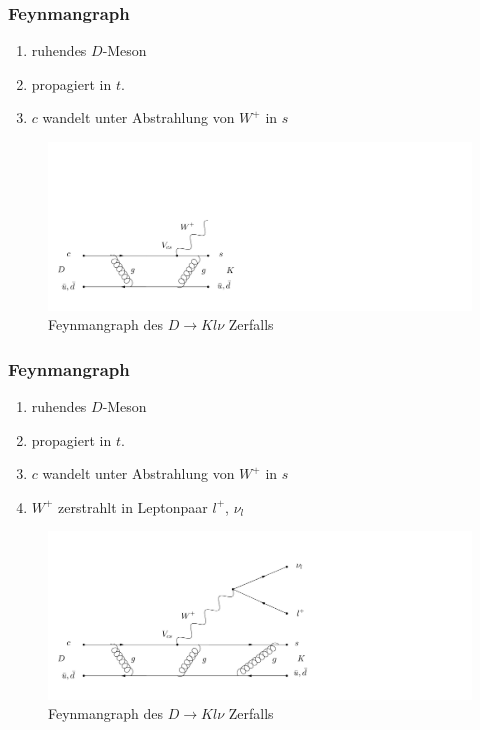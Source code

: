 \documentclass[hyperref={pdfpagelabels=false}]{beamer}
\begin{document}
 \begin{frame}
  \frametitle{Feynmangraph}
  \setcounter{framenumber}{4}
 \begin{minipage}[h]{0.38\textwidth}
  \begin{enumerate}
   \item ruhendes $D$-Meson
   \item propagiert in $t$.
   \item $c$ wandelt unter Abstrahlung von $W^+$ in $s$ 
  \end{enumerate}
 \end{minipage}
 \begin{minipage}[h]{0.58\textwidth}
   \begin{figure}[h]
   \includegraphics[width = 1.9\textwidth]{../Abbildungen/DFeyn3.png}
    \caption{Feynmangraph des $D\rightarrow Kl\nu$ Zerfalls}
  \end{figure}
 \end{minipage}
 \end{frame}
 
 \begin{frame}
  \frametitle{Feynmangraph}
  \setcounter{framenumber}{4}
 \begin{minipage}[h]{0.38\textwidth}
  \begin{enumerate}
   \item ruhendes $D$-Meson
   \item propagiert in $t$.
   \item $c$ wandelt unter Abstrahlung von $W^+$ in $s$
   \item $W^+$ zerstrahlt in Leptonpaar $l^+$, $\nu_l$
  \end{enumerate}
 \end{minipage}
 \begin{minipage}[h]{0.58\textwidth}
   \begin{figure}[h]
   \includegraphics[width = 1.9\textwidth]{../Abbildungen/DFeyn4.png}
    \caption{Feynmangraph des $D\rightarrow Kl\nu$ Zerfalls}
  \end{figure}
 \end{minipage}
 \end{frame}
 
\end{document}
